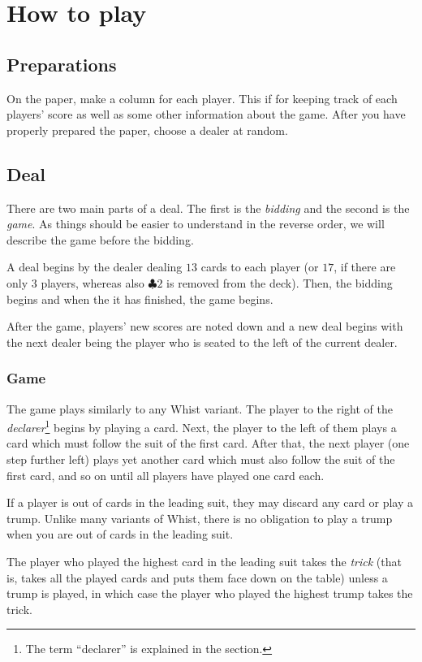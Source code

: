 \documentclass[a4paper]{article}
\begin{document}
	\section{How to play}{%
		\subsection{Preparations}{%
			On the paper, make a column for each player. This if for keeping track of each players' score as well as some other information about the game. After you have properly prepared the paper, choose a dealer at random.
		}

		\subsection{Deal}{%
			There are two main parts of a deal. The first is the \emph{bidding} and the second is the \emph{game}. As things should be easier to understand in the reverse order, we will describe the game before the bidding.

			A deal begins by the dealer dealing $13$ cards to each player (or $17$, if there are only $3$ players, whereas also $\clubsuit 2$ is removed from the deck). Then, the bidding begins and when the it has finished, the game begins.

			After the game, players' new scores are noted down and a new deal begins with the next dealer being the player who is seated to the left of the current dealer.

			\subsubsection{Game}{%
				The game plays similarly to any Whist variant. The player to the right of the \emph{declarer}\footnote{The term ``declarer'' is explained in the \textit{} section.} begins by playing a card. Next, the player to the left of them plays a card which must follow the suit of the first card. After that, the next player (one step further left) plays yet another card which must also follow the suit of the first card, and so on until all players have played one card each.

				If a player is out of cards in the leading suit, they may discard any card or play a trump. Unlike many variants of Whist, there is no obligation to play a trump when you are out of cards in the leading suit.

				The player who played the highest card in the leading suit takes the \emph{trick} (that is, takes all the played cards and puts them face down on the table) unless a trump is played, in which case the player who played the highest trump takes the trick.

}}}
\end{document}
